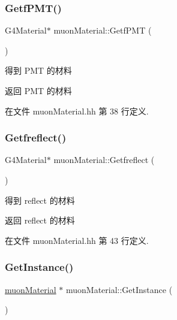\subsubsection{\texorpdfstring{Getf\+P\+M\+T()}{GetfPMT()}}
{\footnotesize\ttfamily G4\+Material$\ast$ muon\+Material\+::\+Getf\+P\+MT (\begin{DoxyParamCaption}{ }\end{DoxyParamCaption})\hspace{0.3cm}{\ttfamily [inline]}}



得到 P\+MT 的材料 

\begin{DoxyReturn}{返回}
P\+MT 的材料 
\end{DoxyReturn}


在文件 muon\+Material.\+hh 第 38 行定义.

\mbox{\label{classmuonMaterial_a8b1a5528153587650e3990045cae47a1}} 
\subsubsection{\texorpdfstring{Getfreflect()}{Getfreflect()}}
{\footnotesize\ttfamily G4\+Material$\ast$ muon\+Material\+::\+Getfreflect (\begin{DoxyParamCaption}{ }\end{DoxyParamCaption})\hspace{0.3cm}{\ttfamily [inline]}}



得到 reflect 的材料 

\begin{DoxyReturn}{返回}
reflect 的材料 
\end{DoxyReturn}


在文件 muon\+Material.\+hh 第 43 行定义.

\mbox{\label{classmuonMaterial_ac5be4443f4de88103fea67e651cc554b}} 
\subsubsection{\texorpdfstring{Get\+Instance()}{GetInstance()}}
{\footnotesize\ttfamily \hyperlink{classmuonMaterial}{muon\+Material} $\ast$ muon\+Material\+::\+Get\+Instance (\begin{DoxyParamCaption}{ }\end{DoxyParamCaption})\hspace{0.3cm}{\ttfamily [static]}}



